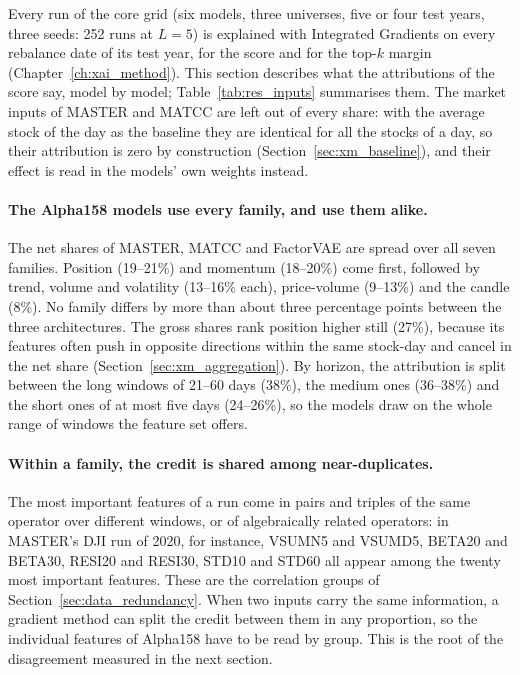 Every run of the core grid (six models, three universes, five or four test years, three seeds: 252 runs at $L = 5$) is explained with Integrated Gradients on every rebalance date of its test year, for the score and for the top-$k$ margin (Chapter~\ref{ch:xai_method}). This section describes what the attributions of the score say, model by model; Table~\ref{tab:res_inputs} summarises them. The market inputs of MASTER and MATCC are left out of every share: with the average stock of the day as the baseline they are identical for all the stocks of a day, so their attribution is zero by construction (Section~\ref{sec:xm_baseline}), and their effect is read in the models' own weights instead.



\paragraph{The Alpha158 models use every family, and use them alike.} The net shares of MASTER, MATCC and FactorVAE are spread over all seven families. Position (19--21\%) and momentum (18--20\%) come first, followed by trend, volume and volatility (13--16\% each), price-volume (9--13\%) and the candle (8\%). No family differs by more than about three percentage points between the three architectures. The gross shares rank position higher still (27\%), because its features often push in opposite directions within the same stock-day and cancel in the net share (Section~\ref{sec:xm_aggregation}). By horizon, the attribution is split between the long windows of 21--60 days (38\%), the medium ones (36--38\%) and the short ones of at most five days (24--26\%), so the models draw on the whole range of windows the feature set offers.

\paragraph{Within a family, the credit is shared among near-duplicates.} The most important features of a run come in pairs and triples of the same operator over different windows, or of algebraically related operators: in MASTER's DJI run of 2020, for instance, VSUMN5 and VSUMD5, BETA20 and BETA30, RESI20 and RESI30, STD10 and STD60 all appear among the twenty most important features. These are the correlation groups of Section~\ref{sec:data_redundancy}. When two inputs carry the same information, a gradient method can split the credit between them in any proportion, so the individual features of Alpha158 have to be read by group. This is the root of the disagreement measured in the next section.

